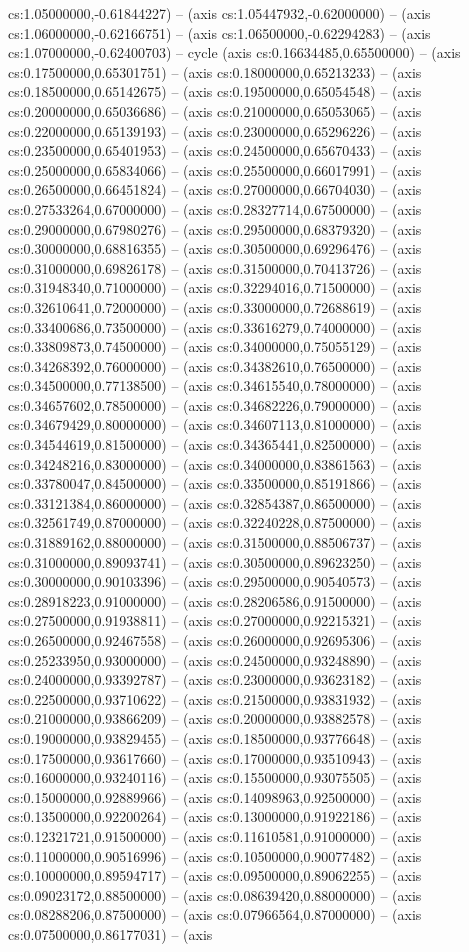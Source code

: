 cs:1.05000000,-0.61844227) -- (axis cs:1.05447932,-0.62000000) -- (axis cs:1.06000000,-0.62166751) -- (axis cs:1.06500000,-0.62294283) -- (axis cs:1.07000000,-0.62400703) -- cycle (axis cs:0.16634485,0.65500000) -- (axis cs:0.17500000,0.65301751) -- (axis cs:0.18000000,0.65213233) -- (axis cs:0.18500000,0.65142675) -- (axis cs:0.19500000,0.65054548) -- (axis cs:0.20000000,0.65036686) -- (axis cs:0.21000000,0.65053065) -- (axis cs:0.22000000,0.65139193) -- (axis cs:0.23000000,0.65296226) -- (axis cs:0.23500000,0.65401953) -- (axis cs:0.24500000,0.65670433) -- (axis cs:0.25000000,0.65834066) -- (axis cs:0.25500000,0.66017991) -- (axis cs:0.26500000,0.66451824) -- (axis cs:0.27000000,0.66704030) -- (axis cs:0.27533264,0.67000000) -- (axis cs:0.28327714,0.67500000) -- (axis cs:0.29000000,0.67980276) -- (axis cs:0.29500000,0.68379320) -- (axis cs:0.30000000,0.68816355) -- (axis cs:0.30500000,0.69296476) -- (axis cs:0.31000000,0.69826178) -- (axis cs:0.31500000,0.70413726) -- (axis cs:0.31948340,0.71000000) -- (axis cs:0.32294016,0.71500000) -- (axis cs:0.32610641,0.72000000) -- (axis cs:0.33000000,0.72688619) -- (axis cs:0.33400686,0.73500000) -- (axis cs:0.33616279,0.74000000) -- (axis cs:0.33809873,0.74500000) -- (axis cs:0.34000000,0.75055129) -- (axis cs:0.34268392,0.76000000) -- (axis cs:0.34382610,0.76500000) -- (axis cs:0.34500000,0.77138500) -- (axis cs:0.34615540,0.78000000) -- (axis cs:0.34657602,0.78500000) -- (axis cs:0.34682226,0.79000000) -- (axis cs:0.34679429,0.80000000) -- (axis cs:0.34607113,0.81000000) -- (axis cs:0.34544619,0.81500000) -- (axis cs:0.34365441,0.82500000) -- (axis cs:0.34248216,0.83000000) -- (axis cs:0.34000000,0.83861563) -- (axis cs:0.33780047,0.84500000) -- (axis cs:0.33500000,0.85191866) -- (axis cs:0.33121384,0.86000000) -- (axis cs:0.32854387,0.86500000) -- (axis cs:0.32561749,0.87000000) -- (axis cs:0.32240228,0.87500000) -- (axis cs:0.31889162,0.88000000) -- (axis cs:0.31500000,0.88506737) -- (axis cs:0.31000000,0.89093741) -- (axis cs:0.30500000,0.89623250) -- (axis cs:0.30000000,0.90103396) -- (axis cs:0.29500000,0.90540573) -- (axis cs:0.28918223,0.91000000) -- (axis cs:0.28206586,0.91500000) -- (axis cs:0.27500000,0.91938811) -- (axis cs:0.27000000,0.92215321) -- (axis cs:0.26500000,0.92467558) -- (axis cs:0.26000000,0.92695306) -- (axis cs:0.25233950,0.93000000) -- (axis cs:0.24500000,0.93248890) -- (axis cs:0.24000000,0.93392787) -- (axis cs:0.23000000,0.93623182) -- (axis cs:0.22500000,0.93710622) -- (axis cs:0.21500000,0.93831932) -- (axis cs:0.21000000,0.93866209) -- (axis cs:0.20000000,0.93882578) -- (axis cs:0.19000000,0.93829455) -- (axis cs:0.18500000,0.93776648) -- (axis cs:0.17500000,0.93617660) -- (axis cs:0.17000000,0.93510943) -- (axis cs:0.16000000,0.93240116) -- (axis cs:0.15500000,0.93075505) -- (axis cs:0.15000000,0.92889966) -- (axis cs:0.14098963,0.92500000) -- (axis cs:0.13500000,0.92200264) -- (axis cs:0.13000000,0.91922186) -- (axis cs:0.12321721,0.91500000) -- (axis cs:0.11610581,0.91000000) -- (axis cs:0.11000000,0.90516996) -- (axis cs:0.10500000,0.90077482) -- (axis cs:0.10000000,0.89594717) -- (axis cs:0.09500000,0.89062255) -- (axis cs:0.09023172,0.88500000) -- (axis cs:0.08639420,0.88000000) -- (axis cs:0.08288206,0.87500000) -- (axis cs:0.07966564,0.87000000) -- (axis cs:0.07500000,0.86177031) -- (axis 